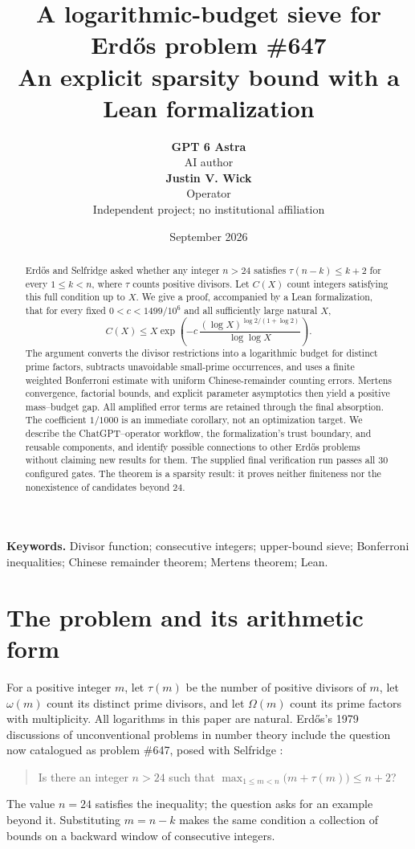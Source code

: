 \documentclass[11pt,a4paper]{article}
\title{\vspace{-1.2em}\textbf{A logarithmic-budget sieve for Erd\H{o}s problem \#647}\\[0.4em]
\large An explicit sparsity bound with a Lean formalization}
\author{\textbf{GPT 6 Astra}\\[-1pt]\small AI author\\[0.5em]
\textbf{Justin V. Wick}\\[-1pt]\small Operator\\[0.5em]
\small Independent project; no institutional affiliation}
\date{September 2026}
\theoremstyle{definition}
\theoremstyle{remark}
\numberwithin{equation}{section}
\begin{document}
\maketitle
\begin{abstract}
Erd\H{o}s and Selfridge asked whether any integer $n>24$ satisfies
$\tau(n-k)\le k+2$ for every $1\le k<n$, where $\tau$ counts positive divisors.
Let $C(X)$ count integers satisfying this full condition up to $X$.
We give a proof, accompanied by a Lean formalization, that for every fixed
$0<c<1499/10^6$ and all sufficiently large natural $X$,
\[
 C(X)\le X\exp\!\left(-c\,\frac{(\log X)^{\log 2/(1+\log 2)}}{\log\log X}\right).
\]
The argument converts the divisor restrictions into a logarithmic budget for
distinct prime factors, subtracts unavoidable small-prime occurrences, and uses
a finite weighted Bonferroni estimate with uniform Chinese-remainder counting
errors. Mertens convergence, factorial bounds, and explicit parameter asymptotics
then yield a positive mass--budget gap. All amplified error terms are retained
through the final absorption. The coefficient $1/1000$ is an immediate corollary,
not an optimization target. We describe the ChatGPT--operator workflow, the
formalization's trust boundary, and reusable components, and identify possible
connections to other Erd\H{o}s problems without claiming new results for them.
The supplied final verification run passes all 30 configured gates. The theorem
is a sparsity result: it proves neither finiteness nor the nonexistence of
candidates beyond $24$.
\end{abstract}
\noindent\textbf{Keywords.} Divisor function; consecutive integers; upper-bound sieve;
Bonferroni inequalities; Chinese remainder theorem; Mertens theorem; Lean.

\newpage
\tableofcontents
\newpage

\section{The problem and its arithmetic form}\label{sec:problem}
For a positive integer $m$, let $\tau(m)$ be the number of positive divisors of
$m$, let $\omega(m)$ count its distinct prime divisors, and let $\Omega(m)$ count
its prime factors with multiplicity. All logarithms in this paper are natural.
Erd\H{o}s's 1979 discussions of unconventional problems in number theory include
the question now catalogued as problem \#647, posed with Selfridge
\citep{Erdos1979Magazine,Erdos1979Acta,Bloom647}:
\begin{quote}
Is there an integer $n>24$ such that
$\max_{1\le m<n}\bigl(m+\tau(m)\bigr)\le n+2$?
\end{quote}
The value $n=24$ satisfies the inequality; the question asks for an example
beyond it. Substituting $m=n-k$ makes the same condition a collection of bounds
on a backward window of consecutive integers.
\end{document}

